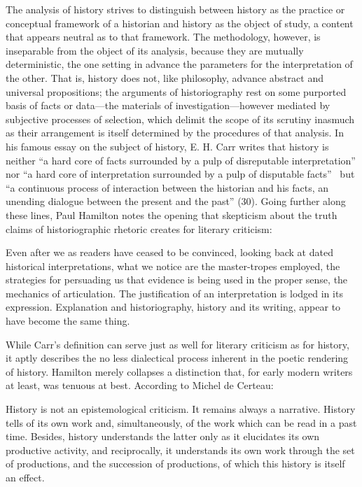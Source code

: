 The analysis of history strives to distinguish between history as the practice or conceptual framework of a historian and history as the object of study, a content that appears neutral as to that framework. The methodology, however, is inseparable from the object of its analysis, because they are mutually deterministic, the one setting in advance the parameters for the interpretation of the other. That is, history does not, like philosophy, advance abstract and universal propositions; the arguments of historiography rest on some purported basis of facts or data---the materials of investigation---however mediated by subjective processes of selection, which delimit the scope of its scrutiny inasmuch as their arrangement is itself determined by the procedures of that analysis. In his famous essay on the subject of history, E. H. Carr writes that history is neither ``a hard core of facts surrounded by a pulp of disreputable interpretation'' nor ``a hard core of interpretation surrounded by a pulp of disputable facts''~\cite[23--24]{carr_what_1962} but ``a continuous process of interaction between the historian and his facts, an unending dialogue between the present and the past'' (30). Going further along these lines, Paul Hamilton notes the opening that skepticism about the truth claims of historiographic rhetoric creates for literary criticism:
\begin{bq}
Even after we as readers have ceased to be convinced, looking back at dated historical interpretations, what we notice are the master-tropes employed, the strategies for persuading us that evidence is being used in the proper sense, the mechanics of articulation. The justification of an interpretation is lodged in its expression. Explanation and historiography, history and its writing, appear to have become the same thing.~\cite[18]{hamilton_historicism_1996}
\end{bq}
While Carr's definition can serve just as well for literary criticism as for history, it aptly describes the no less dialectical process inherent in the poetic rendering of history. Hamilton merely collapses a distinction that, for early modern writers at least, was tenuous at best. According to Michel de Certeau:
\begin{bq}
History is not an epistemological criticism. It remains always a narrative. History tells of its own work and, simultaneously, of the work which can be read in a past time. Besides, history understands the latter only as it elucidates its own productive activity, and reciprocally, it understands its own work through the set of productions, and the succession of productions, of which this history is itself an effect.~\cite[43]{certeau_writing_1988}
\end{bq}
